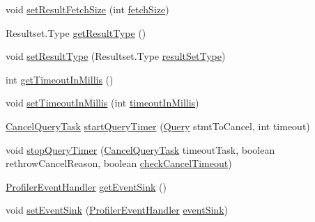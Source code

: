 \begin{DoxyCompactItemize}
void \mbox{\hyperlink{classcom_1_1mysql_1_1cj_1_1_abstract_query_a02cd9bee7792ccf53455cd42df11b27a}{set\+Result\+Fetch\+Size}} (int \mbox{\hyperlink{classcom_1_1mysql_1_1cj_1_1_abstract_query_ab5542f44a4ae49ed220f44aa4baae03f}{fetch\+Size}})
\item 
Resultset.\+Type \mbox{\hyperlink{classcom_1_1mysql_1_1cj_1_1_abstract_query_a0102246c803083e6368ceb9052275694}{get\+Result\+Type}} ()
\item 
void \mbox{\hyperlink{classcom_1_1mysql_1_1cj_1_1_abstract_query_a169b32f7a5ede30f551d3ee53b0c4ac4}{set\+Result\+Type}} (Resultset.\+Type \mbox{\hyperlink{classcom_1_1mysql_1_1cj_1_1_abstract_query_a221d45e7acb58be1e2ec467a90df6a20}{result\+Set\+Type}})
\item 
int \mbox{\hyperlink{classcom_1_1mysql_1_1cj_1_1_abstract_query_a4ff067e743c86f5349676c6bddc26eab}{get\+Timeout\+In\+Millis}} ()
\item 
void \mbox{\hyperlink{classcom_1_1mysql_1_1cj_1_1_abstract_query_adcf9dfa4142b1922dc2fd8e09d70795a}{set\+Timeout\+In\+Millis}} (int \mbox{\hyperlink{classcom_1_1mysql_1_1cj_1_1_abstract_query_ad17e5fb0c9a8a7c413116831638c8651}{timeout\+In\+Millis}})
\item 
\mbox{\hyperlink{interfacecom_1_1mysql_1_1cj_1_1_cancel_query_task}{Cancel\+Query\+Task}} \mbox{\hyperlink{classcom_1_1mysql_1_1cj_1_1_abstract_query_af15cecea61e92e9c1e6e6d01990cf568}{start\+Query\+Timer}} (\mbox{\hyperlink{interfacecom_1_1mysql_1_1cj_1_1_query}{Query}} stmt\+To\+Cancel, int timeout)
\item 
void \mbox{\hyperlink{classcom_1_1mysql_1_1cj_1_1_abstract_query_a3cd18b8d44105a54f7b044cf31c04c45}{stop\+Query\+Timer}} (\mbox{\hyperlink{interfacecom_1_1mysql_1_1cj_1_1_cancel_query_task}{Cancel\+Query\+Task}} timeout\+Task, boolean rethrow\+Cancel\+Reason, boolean \mbox{\hyperlink{classcom_1_1mysql_1_1cj_1_1_abstract_query_a995c89e6b09f3bff41729b384c9b1db3}{check\+Cancel\+Timeout}})
\item 
\mbox{\hyperlink{interfacecom_1_1mysql_1_1cj_1_1log_1_1_profiler_event_handler}{Profiler\+Event\+Handler}} \mbox{\hyperlink{classcom_1_1mysql_1_1cj_1_1_abstract_query_aff7c49f712e8aa2e756fc9668f428970}{get\+Event\+Sink}} ()
\item 
void \mbox{\hyperlink{classcom_1_1mysql_1_1cj_1_1_abstract_query_a025ef4b53a1ce527b74fc4d37b87ffcc}{set\+Event\+Sink}} (\mbox{\hyperlink{interfacecom_1_1mysql_1_1cj_1_1log_1_1_profiler_event_handler}{Profiler\+Event\+Handler}} \mbox{\hyperlink{classcom_1_1mysql_1_1cj_1_1_abstract_query_ab150ac7bec3ab4662187594132c91fc0}{event\+Sink}})

\end{DoxyCompactItemize}
